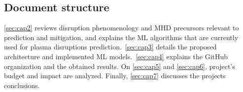 \subsection{Document structure}

\autoref{sec:cap2} reviews disruption phenomenology and MHD precursors relevant to prediction and mitigation, and explains the \ac{ML} algorithms that are currently used for plasma disruptions prediction.\ \autoref{sec:cap3} details the proposed architecture and implemented \ac{ML} models.\ \autoref{sec:cap4} explains the GitHub organization and the obtained results. On \autoref{sec:cap5} and \autoref{sec:cap6}, project's budget and impact are analyzed. Finally, \autoref{sec:cap7} discusses the projects conclusions.

